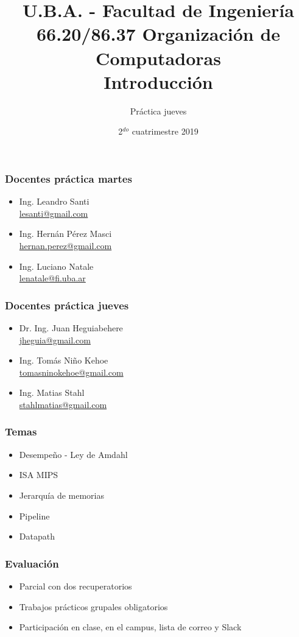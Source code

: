 \documentclass{beamer}
\title[66.20/86.37]{U.B.A. - Facultad de Ingeniería\\\vspace{0.25cm} 66.20/86.37 Organización de Computadoras
  \\Introducción}
\author{Práctica jueves}
\date{2$^{do}$ cuatrimestre 2019}
\begin{document}
\begin{frame}
\titlepage %
\end{frame}

\begin{frame}
 \frametitle{Docentes práctica martes}
 \begin{itemize}
  \item Ing. Leandro Santi\\ \href{mailto:lesanti@gmail.com}{lesanti@gmail.com}
  \item Ing. Hernán Pérez Masci\\ \href{hernan.perez@gmail.com}{hernan.perez@gmail.com}
  \item Ing. Luciano Natale\\ \href{lnatale@fi.uba.ar}{lenatale@fi.uba.ar}
 \end{itemize}
\end{frame}

\begin{frame}
 \frametitle{Docentes práctica jueves}
 \begin{itemize}
  \item Dr. Ing. Juan Heguiabehere\\ \href{mailto:jheguia@gmail.com}{jheguia@gmail.com}
  \item Ing. Tomás Niño Kehoe\\ \href{tomasninokehoe@gmail.com}{tomasninokehoe@gmail.com}
  \item Ing. Matias Stahl\\ \href{stahlmatias@gmail.com}{stahlmatias@gmail.com}
 \end{itemize}
\end{frame}

 \begin{frame}
 \frametitle{Temas}
 \begin{itemize}
  \item Desempeño - Ley de Amdahl
  \item ISA MIPS
  \item Jerarquía de memorias
  \item Pipeline
  \item Datapath
\end{itemize}
 \end{frame}

 \begin{frame}
 \frametitle{Evaluación}
 \begin{itemize}
\item Parcial con dos recuperatorios
\item Trabajos prácticos grupales obligatorios
\item Participación en clase, en el campus, lista de correo y Slack
\end{itemize}
 \end{frame}
\end{document}
